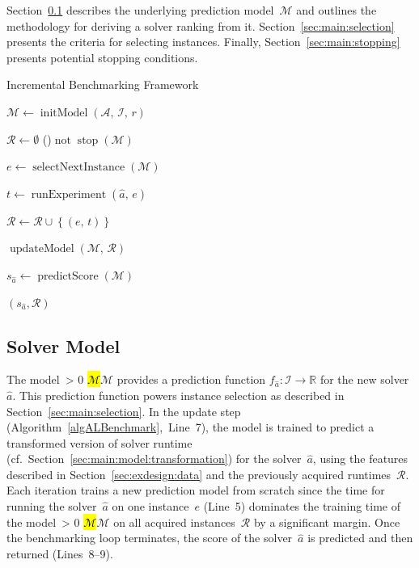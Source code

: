 \documentclass[sn-basic, Numbered]{sn-jnl} %
\newcommand{\showchanges}{1} %
\newcommand{\change}[1]{\ifnum \showchanges > 0 \sethlcolor{yellow}\hl{#1}\else#1\fi}
\begin{document}
Section~\ref{sec:main:model} describes the underlying prediction model~$\mathcal{M}$ and outlines the methodology for deriving a solver ranking from it.
Section~\ref{sec:main:selection} presents the criteria for selecting instances.
Finally, Section~\ref{sec:main:stopping} presents potential stopping conditions.

\begin{algorithm}[t]
  \caption{Incremental Benchmarking Framework}
  \label{algALBenchmark}


  \BlankLine

  $\mathcal{M} \leftarrow \operatorname{initModel}\left(\mathcal{A},\, \mathcal{I},\, r\right)$ 
  
  \BlankLine
  $\mathcal{R} \leftarrow \emptyset$ \;
  \While(){$\operatorname{not} \operatorname{stop}\left(\mathcal{M}\right)$}{
    $e \leftarrow \operatorname{selectNextInstance}\left(\mathcal{M}\right)$ 

    $t \leftarrow \operatorname{runExperiment}\left(\hat{a},\,  e\right)$  

    $\mathcal{R} \leftarrow \mathcal{R} \cup \left\lbrace (e,\, t) \right\rbrace$

    \BlankLine
    $\operatorname{updateModel}\left(\mathcal{M},\, \mathcal{R}\right)$ 
  }
  $s_{\hat a} \leftarrow \operatorname{predictScore}(\mathcal{M})$ 
  
  \BlankLine
  \Return $(s_{\hat a}, \mathcal{R})$
\end{algorithm}


\subsection{Solver Model}
\label{sec:main:model}

The model~\change{$\mathcal{M}$} provides a prediction function $f_{\hat a} : \mathcal{I} \rightarrow \mathbb{R}$ for the new solver $\hat a$.
This prediction function powers instance selection as described in Section~\ref{sec:main:selection}.
In the update step (Algorithm~\ref{algALBenchmark},~Line~7), the model is trained to predict a transformed version of solver runtime (cf.~Section~\ref{sec:main:model:transformation}) for the solver~$\hat{a}$, using the features described in Section~\ref{sec:exdesign:data} and the previously acquired runtimes~$\mathcal{R}$.
Each iteration trains a new prediction model from scratch since the time for running the solver~$\hat{a}$ on one instance~$e$ (Line~5) dominates the training time of the model~\change{$\mathcal{M}$} on all acquired instances~$\mathcal{R}$ by a significant margin.
Once the benchmarking loop terminates, the score of the solver~$\hat{a}$ is predicted and then returned (Lines~8--9).
\end{document}
